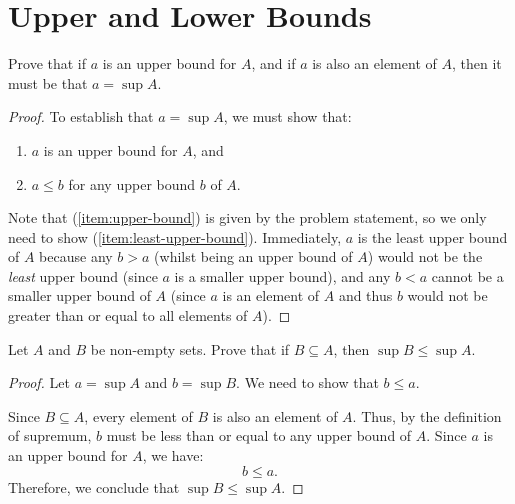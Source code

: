\section{Upper and Lower Bounds}

\begin{problem}\label{prob:bounded-convergent}
  Prove that if $a$ is an upper bound for $A$, and if $a$ is also an element of $A$, then it must be that $a = \sup{A}$.
\end{problem}

\begin{proof}
  To establish that $a = \sup{A}$, we must show that:
  \begin{enumerate}
    \item $a$ is an upper bound for $A$, and \label{item:upper-bound}
    \item $a \leq b$ for any upper bound $b$ of $A$. \label{item:least-upper-bound}
  \end{enumerate}

  Note that (\ref{item:upper-bound}) is given by the problem statement, so we
  only need to show (\ref{item:least-upper-bound}). Immediately, $a$ is the
  least upper bound of $A$ because any $b > a$ (whilst being an upper bound of
  $A$) would not be the \textit{least} upper bound (since $a$ is a smaller upper
  bound), and any $b < a$ cannot be a smaller upper bound of $A$ (since $a$ is an
  element of $A$ and thus $b$ would not be greater than or equal to all
  elements of $A$).
\end{proof}


\begin{problem}\label{prob:sup-subset}
  Let $A$ and $B$ be non-empty sets. Prove that if $B \subseteq A$, then $\sup{B} \leq \sup{A}$.
\end{problem}

\begin{proof}
  Let $a = \sup{A}$ and $b = \sup{B}$. We need to show that $b \leq a$.

  Since $B \subseteq A$, every element of $B$ is also an element of $A$. Thus,
  by the definition of supremum, $b$ must be less than or equal to any upper
  bound of $A$. Since $a$ is an upper bound for $A$, we have:
  \[
    b \leq a.
  \]
  Therefore, we conclude that $\sup{B} \leq \sup{A}$.
\end{proof}


